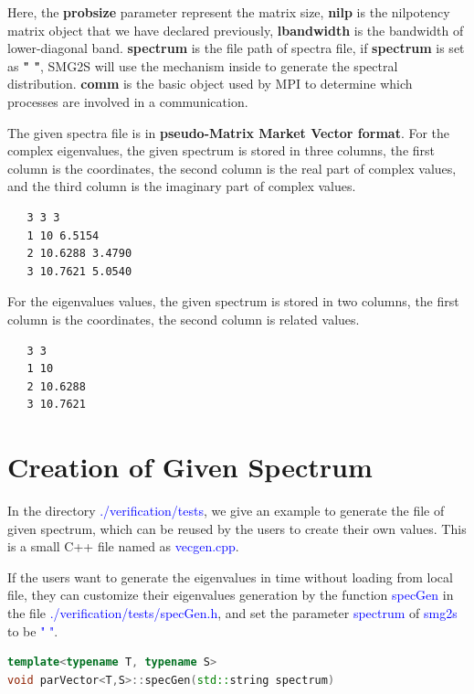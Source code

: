 \documentclass[a4paper, 10 pt]{report}
\begin{document}
	Here, the \textbf{probsize} parameter represent the matrix size, \textbf{nilp} is the nilpotency matrix object that we have declared previously, \textbf{lbandwidth} is the bandwidth of lower-diagonal band. \textbf{spectrum} is the file path of spectra file, if \textbf{spectrum} is set as \textbf{" "}, SMG2S will use the mechanism inside to generate the spectral distribution. \textbf{comm} is the basic object used by MPI to determine which processes are involved in a communication.
	
	The given spectra file is in \textbf{pseudo-Matrix Market Vector format}. For the complex eigenvalues, the given spectrum is stored in three columns, the first column is the coordinates, the second column is the real part of complex values, and the third column is the imaginary part of complex values.

	\begin{lstlisting}[language=bash,frame=single]
   %%MatrixMarket matrix coordinate complex general
   3 3 3
   1 10 6.5154
   2 10.6288 3.4790
   3 10.7621 5.0540
	\end{lstlisting}

For the eigenvalues values, the given spectrum is stored in two columns, the first column is the coordinates, the second column is related values.
	\begin{lstlisting}[language=bash,frame=single]
   %%MatrixMarket matrix coordinate complex general
   3 3
   1 10
   2 10.6288
   3 10.7621
\end{lstlisting}

\section{Creation of Given Spectrum}
In the directory \textcolor{blue}{./verification/tests}, we give an example to generate the file of given spectrum, which can be reused by the users to create their own values. This is a small C++ file named as \textcolor{blue}{vecgen.cpp}.

If the users want to generate the eigenvalues in time without loading from local file, they can customize their eigenvalues generation by the function \textcolor{blue}{specGen} in the file \textcolor{blue}{./verification/tests/specGen.h}, and set the parameter \textcolor{blue}{spectrum} of \textcolor{blue}{smg2s} to be \textcolor{blue}{" "}.

	\begin{lstlisting}[language=C++,frame=single]
template<typename T, typename S>
void parVector<T,S>::specGen(std::string spectrum)
\end{lstlisting}
\end{document}
